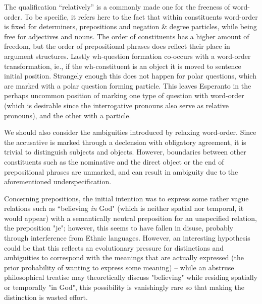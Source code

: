 \documentclass[10pt,a4paper]{article}
\begin{document}
The qualification ``relatively'' is a commonly made one for the freeness of
word-order. To be specific, it refers here to the fact that within
constituents word-order is fixed for determiners, prepositions and negation
\& degree particles, while being free for adjectives and nouns. The order of
constituents has a higher amount of freedom, but the order of prepositional
phrases does reflect their place in argument structures. Lastly wh-question formation
co-occurs with a word-order transformation, ie., if the wh-constituent is an
object it is moved to sentence initial position.  Strangely enough
this does not happen for polar questions, which are marked with a
polar question forming particle. This leaves Esperanto in the perhaps uncommon position
of marking one type of question with word-order (which is desirable since the
interrogative pronouns also serve as relative pronouns), and the other with a particle.

We should also consider the ambiguities introduced by relaxing word-order.
Since the accusative is marked through a declension with obligatory agreement,
it is trivial to distinguish subjects and objects. However, boundaries between
other constituents such as the nominative and the direct object or the end of
prepositional phrases are unmarked, and can result in ambiguity due to the
aforementioned underspecification.

Concerning prepositions, the initial intention was to express some rather vague
relations such as ``believing {\em in} God" (which is neither spatial nor
temporal, it would appear) with a semantically neutral preposition for an
unspecified relation, the preposition "je"; however, this seems to have fallen
in disuse, probably through interference from Ethnic languages. However, an
interesting hypothesis could be that this reflects an evolutionary pressure for
distinctions and ambiguities to correspond with the meanings that are actually
expressed (the prior probability of wanting to express some meaning) -- while
an abstruse philosophical treatise may theoretically discuss "believing" while
residing spatially or temporally "in God", this possibility is vanishingly rare
so that making the distinction is wasted effort.
\end{document}
